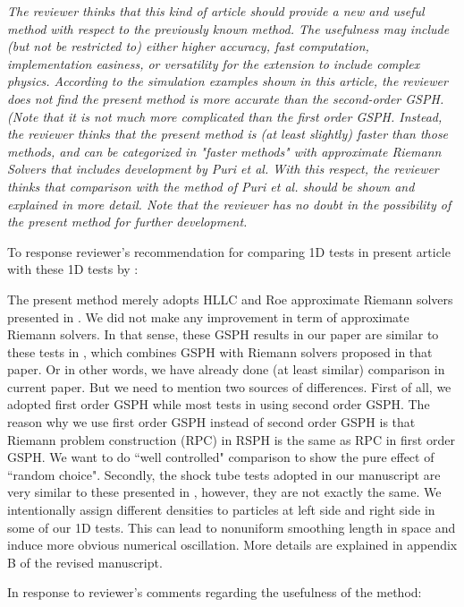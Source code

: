 \documentclass[10pt,a4paper]{article}
\begin{document}
\textit{The reviewer thinks that this kind of article should provide a new and useful method with respect to the previously known method. The usefulness may include (but not be restricted to) either higher accuracy, fast computation, implementation easiness, or versatility for the extension to include complex physics. According to the simulation examples shown in this article, the reviewer does not find the present method is more accurate than the second-order GSPH. (Note that it is not much more complicated than the first order GSPH. Instead, the reviewer thinks that the present method is (at least slightly) faster than those methods, and can be categorized in "faster methods" with approximate Riemann Solvers that includes development by Puri et al. With this respect, the reviewer thinks that comparison with the method of Puri et al. should be shown and explained in more detail. Note that the reviewer has no doubt in the
possibility of the present method for further development.}

To response reviewer's recommendation for comparing 1D tests in present article with these 1D tests by \citet{puri2014approximate}:

The present method merely adopts HLLC and Roe approximate Riemann solvers presented in \citep{puri2014approximate}. We did not make any improvement in term of approximate Riemann solvers. In that sense, these GSPH results in our paper are similar to these tests in \citep{puri2014approximate}, which combines GSPH with Riemann solvers proposed in that paper. Or in other words, we have already done (at least similar) comparison in current paper.
But we need to mention two sources of differences. First of all, we adopted first order GSPH while most tests in \citep{puri2014approximate} using second order GSPH. The reason why we use first order GSPH instead of second order GSPH is that Riemann problem construction (RPC) in RSPH is the same as RPC in first order GSPH. We want to do ``well controlled" comparison to show the pure effect of ``random choice". Secondly, the shock tube tests adopted in our manuscript are very similar to these presented in \citep{puri2014approximate}, however, they are not exactly the same. We intentionally assign different densities to particles at left side and right side in some of our 1D tests. This can lead to nonuniform smoothing length in space and induce more obvious numerical oscillation. More details are explained in appendix B of the revised manuscript.

In response to reviewer's comments regarding the usefulness of the method:
\end{document}
